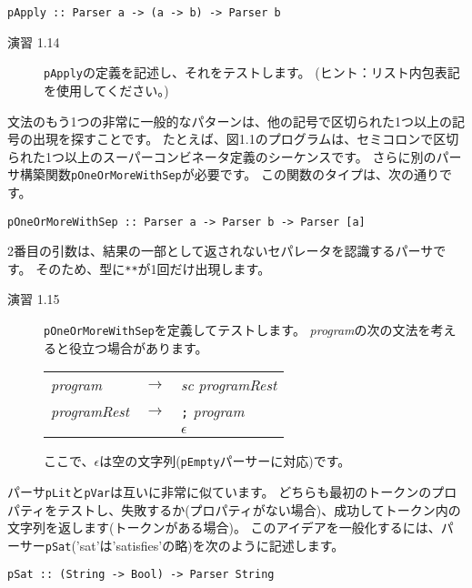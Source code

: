 \documentclass{jarticle}
\begin{document}
\begin{verbatim}
pApply :: Parser a -> (a -> b) -> Parser b
\end{verbatim}

\begin{description}
	\item[演習 1.14] \texttt{pApply}の定義を記述し、それをテストします。
	      (ヒント：リスト内包表記を使用してください。)
\end{description}

文法のもう1つの非常に一般的なパターンは、他の記号で区切られた1つ以上の記号の出現を探すことです。
たとえば、図1.1のプログラムは、セミコロンで区切られた1つ以上のスーパーコンビネータ定義のシーケンスです。
さらに別のパーサ構築関数\texttt{pOneOrMoreWithSep}が必要です。
この関数のタイプは、次の通りです。
\begin{verbatim}
pOneOrMoreWithSep :: Parser a -> Parser b -> Parser [a]
\end{verbatim}
2番目の引数は、結果の一部として返されないセパレータを認識するパーサです。
そのため、型に\texttt{**}が1回だけ出現します。

\begin{description}
	\item[演習 1.15] \texttt{pOneOrMoreWithSep}を定義してテストします。
	      \textit{program}の次の文法を考えると役立つ場合があります。

	      \begin{center}
		      \begin{tabular} {l c l}
			      \textit{program}     & $\rightarrow$ & \textit{sc} \textit{programRest} \\
			      \textit{programRest} & $\rightarrow$ & \texttt{;} \textit{program}      \\
			                           & \textbar      & $\epsilon$
		      \end{tabular}
	      \end{center}

	      ここで、$\epsilon$は空の文字列(\texttt{pEmpty}パーサーに対応)です。
\end{description}

パーサ\texttt{pLit}と\texttt{pVar}は互いに非常に似ています。
どちらも最初のトークンのプロパティをテストし、失敗するか(プロパティがない場合)、成功してトークン内の文字列を返します(トークンがある場合)。
このアイデアを一般化するには、パーサー\texttt{pSat}('sat'は'satisfies'の略)を次のように記述します。

\begin{verbatim}
pSat :: (String -> Bool) -> Parser String
\end{verbatim}
\end{document}
